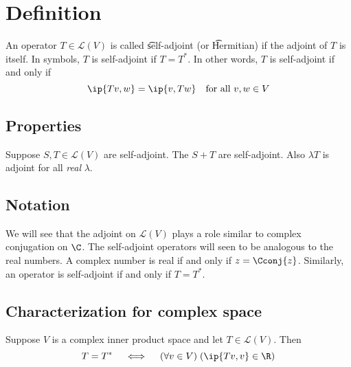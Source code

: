 
\section*{Definition}

An operator $T \in \mathcal{L} (V)$ is called \t{self-adjoint} (or \t{Hermitian}) if the adjoint of $T$ is itself.
In symbols, $T$ is self-adjoint if $T = T^*$.
In other words, $T$ is self-adjoint if and only if
\[
\ip{Tv, w} = \ip{v, Tw} \quad \text{for all } v, w \in V
\]

\subsection*{Properties}

\begin{proposition}
Suppose $S, T \in \mathcal{L} (V)$ are self-adjoint.
The $S + T$ are self-adjoint.
Also $\lambda T$ is adjoint for all \textit{real} $\lambda $.
\end{proposition}

\subsection*{Notation}

We will see that the adjoint on $\mathcal{L} (V)$ plays a role similar to complex conjugation on $\C $.
The self-adjoint operators will seen to be analogous to the real numbers.
A complex number is real if and only if $z = \Cconj{z}$.
Similarly, an operator is self-adjoint if and only if $T = T^*$.

\subsection*{Characterization for complex space}


\begin{proposition}
Suppose $V$ is a complex inner product space and let $T \in \mathcal{L} (V)$.
Then
\[
T = T^* \quad \iff \quad (\forall v \in V)\;(\ip{Tv, v} \in \R )
\]
\end{proposition}

\blankpage